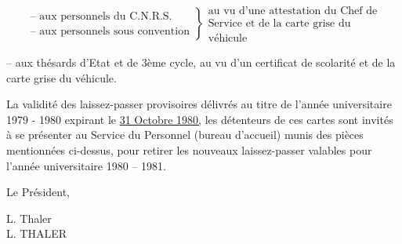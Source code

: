 \[
\left.\begin{array}{l}
\text{-- aux personnels du C.N.R.S.}\\
\text{-- aux personnels sous convention}
\end{array}\right\}
\begin{array}{l}
\text{au vu d'une attestation du Chef de}\\
\text{Service et de la carte grise du}\\
\text{véhicule}
\end{array}
\]

-- aux thésards d'Etat et de 3ème cycle, au vu d'un certificat de scolarité et de la carte grise du véhicule.

La validité des laissez-passer provisoires délivrés au titre de l'année universitaire 1979 - 1980 expirant le \uline{31 Octobre 1980,} les détenteurs de ces cartes sont invités à se présenter au Service du Personnel (bureau d'accueil) munis des pièces mentionnées ci-dessus, pour retirer les nouveaux laissez-passer valables pour l'année universitaire 1980 -- 1981.

Le Président,

L. Thaler\\
L. THALER




